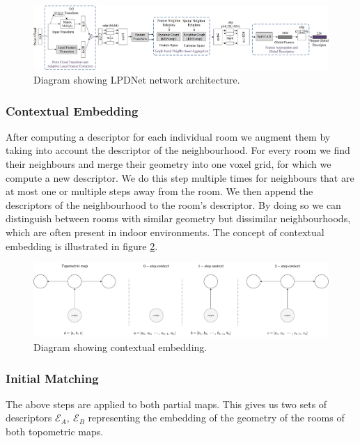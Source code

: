 
\begin{figure}[h]
    \centering
    \includegraphics*[width=\textwidth]{./fig/network_architecture.png}
    \caption{Diagram showing LPDNet network architecture.}
    \label{fig:lpdnet_architecture}
\end{figure}

\subsubsection{Contextual Embedding}
After computing a descriptor for each individual room we augment them by taking into account the descriptor of the neighbourhood. For every room we find their neighbours and merge their geometry into one voxel grid, for which we compute a new descriptor. We do this step multiple times for neighbours that are at most one or multiple steps away from the room. We then append the descriptors of the neighbourhood to the room's descriptor. By doing so we can distinguish between rooms with similar geometry but dissimilar neighbourhoods, which are often present in indoor environments. The concept of contextual embedding is illustrated in figure \ref{fig:contextual_embedding}.

\begin{figure}[h]
    \centering
    \includegraphics*[width=\textwidth]{./fig/embed_context.pdf}
    \caption{Diagram showing contextual embedding.}
    \label{fig:contextual_embedding}
\end{figure}

\subsubsection{Initial Matching}
The above steps are applied to both partial maps. This gives us two sets of descriptors \(\mathcal{E}_A,\ \mathcal{E}_B\) representing the embedding of the geometry of the rooms of both topometric maps.

